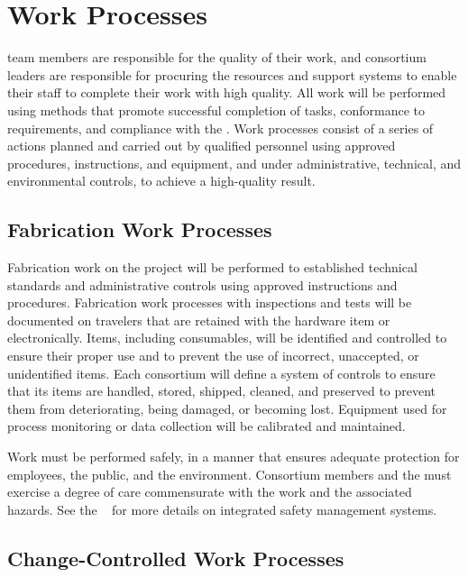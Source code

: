 \section{Work Processes}

 team members are responsible for the quality of their
work, and consortium leaders are responsible for procuring the
resources and support systems to enable their staff to complete their
work with high quality. All  work will be performed using
methods that promote successful completion of tasks, conformance to
 requirements, and compliance with the
 . Work processes consist of a
series of actions planned and carried out by qualified personnel using
approved procedures, instructions, and equipment, and under administrative,
technical, and environmental controls, to achieve a high-quality
result.

\subsection{Fabrication Work Processes}

Fabrication work on the  project will be performed to
established technical standards and administrative controls using
approved instructions and procedures. Fabrication work processes with
 inspections and tests will be documented on travelers that
are retained with the hardware item or %
electronically. Items, including consumables, will be identified and
controlled to ensure their proper use and to  prevent the use of
incorrect, unaccepted, or unidentified items. Each consortium will define
a system of controls to ensure that its items are handled, stored,
shipped, cleaned, and preserved to prevent them from deteriorating,
being damaged, or becoming lost. Equipment used for process monitoring
or data collection will be calibrated and maintained. 

Work must be performed safely, in a manner that ensures adequate
protection for employees, the public, and the environment. Consortium
members and the   must exercise a degree of
care commensurate with the work and the associated hazards. See the
 ~\cite{bib:docdb291} for more details on
 integrated safety management systems. 

\subsection{Change-Controlled Work Processes}
\label{sec:change-control}

